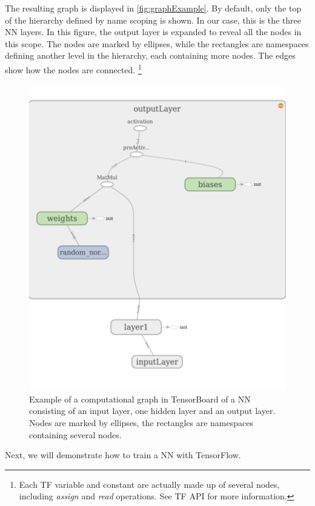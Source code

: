 \documentclass[twoside,english]{uiofysmaster}
\begin{document}
The resulting graph is displayed in \autoref{fig:graphExample}. 
By default, only the top of the hierarchy defined by name scoping is shown. In our case, this
is the three NN layers. In this figure, the output layer is expanded to reveal all the nodes in this scope. 
The nodes are marked by ellipses, while the rectangles are namespaces defining another level in the hierarchy, 
each containing more nodes. The edges show how the nodes are connected. 
\footnote{Each TF variable and constant are actually made up of several nodes, including \textit{assign} and 
\textit{read} operations. See TF API for more information.}
\begin{figure}[H]
\centering
  \includegraphics[width=0.7\linewidth]{Figures/Implementation/tensorBoardExample.pdf}
  \caption{Example of a computational graph in TensorBoard of a NN consisting of an input layer, one 
	   hidden layer and an output layer. Nodes are marked by ellipses, the rectangles are namespaces
	   containing several nodes.} 
  \label{fig:graphExample}
\end{figure}
Next, we will demonstrate how to train a NN with TensorFlow. 
\end{document}
